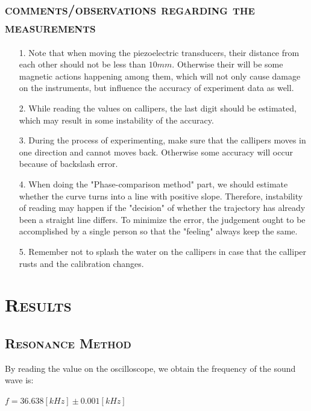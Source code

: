 \documentclass[a4paper,12pt]{article}
\begin{document}
\subsection{\textsc{comments/observations regarding the measurements}}
\begin{itemize}
\item[1.]
Note that when moving the piezoelectric transducers, their distance from each other should not be less than $10 mm$. Otherwise their will be some magnetic actions happening among them, which will not only cause damage on the instruments, but influence the accuracy of experiment data as well.
\item[2.]
While reading the values on callipers, the last digit should be estimated, which may result in some instability of the accuracy.
\item[3.]
During the process of experimenting, make sure that the callipers moves in one direction and cannot moves back. Otherwise some accuracy will occur because of backslash error.
\item[4.]
When doing the "Phase-comparison method" part, we should estimate whether the curve turns into a line with positive slope. Therefore, instability of reading may happen if the "decision" of whether the trajectory has already been a straight line differs. To minimize the error, the judgement ought to be accomplished by a single person so that the "feeling" always keep the same.
\item[5.]
Remember not to splash the water on the callipers in case that the calliper rusts and the calibration changes.
\end{itemize}


\section{\textsc{Results}}
\subsection{\textsc{Resonance Method}}
By reading the value on the oscilloscope, we obtain the frequency of the sound wave is:

\begin{center}
$f = 36.638 [kHz] \pm 0.001 [kHz]$
\end{center}
\end{document}

